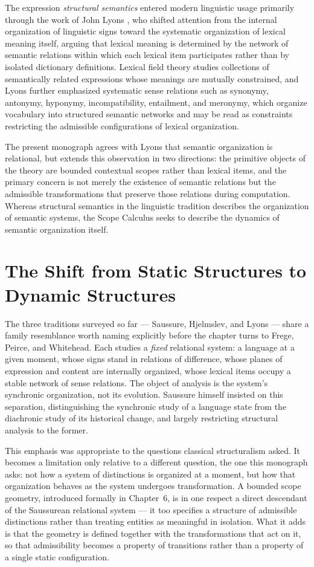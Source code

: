 \documentclass[11pt,twoside,openright]{book}
\numberwithin{equation}{chapter}
\theoremstyle{definition}
\theoremstyle{plain}
\theoremstyle{remark}
\theoremstyle{definition}
\begin{document}
The expression \emph{structural semantics} entered modern linguistic
usage primarily through the work of John Lyons \cite{Lyons1963,Lyons1977},
who shifted attention from the internal organization of linguistic signs
toward the systematic organization of lexical meaning itself, arguing
that lexical meaning is determined by the network of semantic relations
within which each lexical item participates rather than by isolated
dictionary definitions. Lexical field theory studies collections of
semantically related expressions whose meanings are mutually constrained,
and Lyons further emphasized systematic sense relations such as synonymy,
antonymy, hyponymy, incompatibility, entailment, and meronymy, which
organize vocabulary into structured semantic networks and may be read as
constraints restricting the admissible configurations of lexical
organization.

The present monograph agrees with Lyons that semantic organization is
relational, but extends this observation in two directions: the primitive
objects of the theory are bounded contextual scopes rather than lexical
items, and the primary concern is not merely the existence of semantic
relations but the admissible transformations that preserve those
relations during computation. Whereas structural semantics in the
linguistic tradition describes the organization of semantic systems, the
Scope Calculus seeks to describe the dynamics of semantic organization
itself.

\section{The Shift from Static Structures to Dynamic Structures}

The three traditions surveyed so far --- Saussure, Hjelmslev, and Lyons
--- share a family resemblance worth naming explicitly before the
chapter turns to Frege, Peirce, and Whitehead. Each studies a
\emph{fixed} relational system: a language at a given moment, whose signs
stand in relations of difference, whose planes of expression and content
are internally organized, whose lexical items occupy a stable network of
sense relations. The object of analysis is the system's synchronic
organization, not its evolution. Saussure himself insisted on this
separation, distinguishing the synchronic study of a language state from
the diachronic study of its historical change, and largely restricting
structural analysis to the former.

This emphasis was appropriate to the questions classical structuralism
asked. It becomes a limitation only relative to a different question,
the one this monograph asks: not how a system of distinctions is
organized at a moment, but how that organization behaves as the system
undergoes transformation. A bounded scope geometry, introduced formally
in Chapter~6, is in one respect a direct descendant of the Saussurean
relational system --- it too specifies a structure of admissible
distinctions rather than treating entities as meaningful in isolation.
What it adds is that the geometry is defined together with the
transformations that act on it, so that admissibility becomes a property
of transitions rather than a property of a single static configuration.
\end{document}
